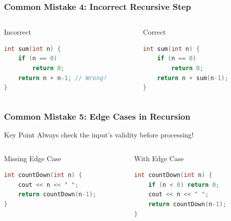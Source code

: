 \documentclass{beamer}
\begin{document}
\begin{frame}[fragile]
\frametitle{Common Mistake 4: Incorrect Recursive Step}
\begin{columns}
\begin{column}{0.48\textwidth}
\begin{block}{Incorrect}
\begin{lstlisting}[language=C++]
int sum(int n) {
    if (n == 0) 
        return 0;
    return n + n-1; // Wrong!
}
\end{lstlisting}
\end{block}
\end{column}

\begin{column}{0.48\textwidth}
\begin{block}{Correct}
\begin{lstlisting}[language=C++]
int sum(int n) {
    if (n == 0) 
        return 0;
    return n + sum(n-1);
}
\end{lstlisting}
\end{block}
\end{column}
\end{columns}
\end{frame}

\begin{frame}[fragile]
\frametitle{Common Mistake 5: Edge Cases in Recursion}
\begin{alertblock}{Key Point}
Always check the input's validity before processing!
\end{alertblock}

\begin{columns}
\begin{column}{0.48\textwidth}
\begin{block}{Missing Edge Case}
\begin{lstlisting}[language=C++]
int countDown(int n) {
    cout << n << " ";
    return countDown(n-1);
}
\end{lstlisting}
\end{block}
\end{column}

\begin{column}{0.48\textwidth}
\begin{block}{With Edge Case}
\begin{lstlisting}[language=C++]
int countDown(int n) {
    if (n < 0) return 0;
    cout << n << " ";
    return countDown(n-1);
}
\end{lstlisting}
\end{block}
\end{column}
\end{columns}
\end{frame}
\end{document}
